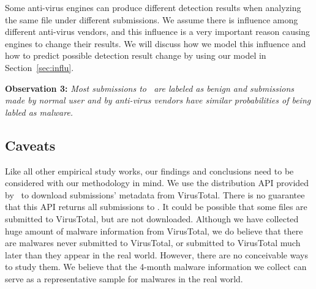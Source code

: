 Some anti-virus engines can produce different detection results when analyzing the same file under different submissions.
We assume there is influence among different anti-virus vendors, 
and this influence is a very important reason causing engines to change their results.
We will discuss how we model this influence and how to predict possible detection result change by using our model in Section~\ref{sec:influ}.
\fi

{\bf Observation 3:} 
{\em Most submissions to \vt\ are labeled as benign and 
submissions made by normal user and by anti-virus vendors have similar probabilities of being labled as malware.}

\subsection{Caveats}
Like all other empirical study works, 
our findings and conclusions need to be considered with our methodology in mind. 
We use the distribution API provided by \vt\ to download submissions' metadata 
from VirusTotal. 
There is no guarantee that this API returns all submissions to \vt.
It could be possible that some files are submitted to VirusTotal, 
but are not downloaded. %
Although we have collected huge amount of malware information from VirusTotal,
we do believe that there are malwares never submitted to VirusTotal, 
or submitted to VirusTotal much later than they appear in the real world. 
However, there are no conceivable ways to study them.
We believe that the 4-month malware information we collect can serve as a representative sample for malwares in the real world. 
